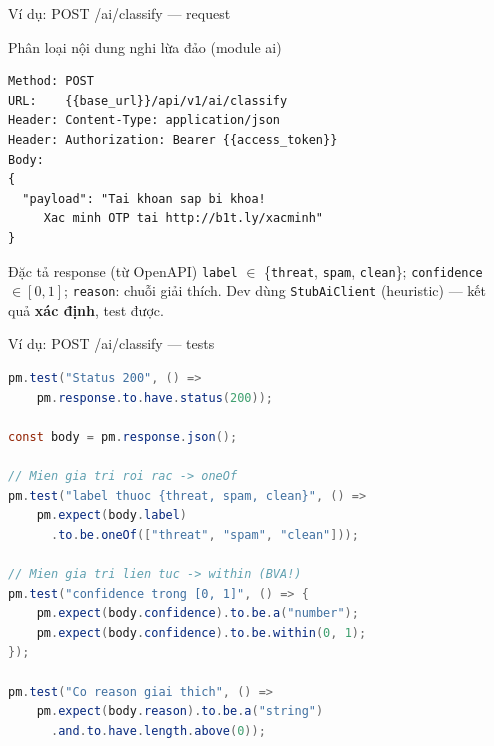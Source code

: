 \documentclass[aspectratio=169,12pt]{beamer}
\begin{document}
\begin{frame}[fragile]{Ví dụ: POST /ai/classify --- request}
  \begin{block}{Phân loại nội dung nghi lừa đảo (module ai)}
\begin{lstlisting}[language={}]
Method: POST
URL:    {{base_url}}/api/v1/ai/classify
Header: Content-Type: application/json
Header: Authorization: Bearer {{access_token}}
Body:
{
  "payload": "Tai khoan sap bi khoa!
     Xac minh OTP tai http://b1t.ly/xacminh"
}
\end{lstlisting}
  \end{block}

  \begin{block}{Đặc tả response (từ OpenAPI)}
    \small \texttt{label} $\in$ \{\texttt{threat}, \texttt{spam}, \texttt{clean}\};
    \texttt{confidence} $\in [0, 1]$; \texttt{reason}: chuỗi giải thích.
    Dev dùng \texttt{StubAiClient} (heuristic) --- kết quả \textbf{xác định},
    test được.
  \end{block}
\end{frame}

\begin{frame}[fragile]{Ví dụ: POST /ai/classify --- tests}
\begin{lstlisting}[language=Java,basicstyle=\ttfamily\scriptsize]
pm.test("Status 200", () =>
    pm.response.to.have.status(200));

const body = pm.response.json();

// Mien gia tri roi rac -> oneOf
pm.test("label thuoc {threat, spam, clean}", () =>
    pm.expect(body.label)
      .to.be.oneOf(["threat", "spam", "clean"]));

// Mien gia tri lien tuc -> within (BVA!)
pm.test("confidence trong [0, 1]", () => {
    pm.expect(body.confidence).to.be.a("number");
    pm.expect(body.confidence).to.be.within(0, 1);
});

pm.test("Co reason giai thich", () =>
    pm.expect(body.reason).to.be.a("string")
      .and.to.have.length.above(0));
\end{lstlisting}
\end{frame}
\end{document}
